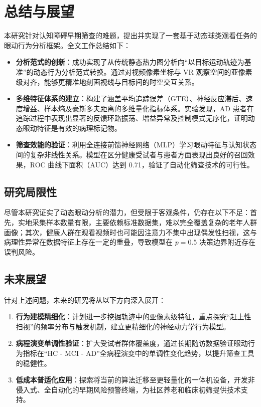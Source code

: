 \documentclass[12pt,hyperref,a4paper,UTF8]{ctexart}
\begin{document}
\section{总结与展望}
本研究针对认知障碍早期筛查的难题，提出并实现了一套基于动态球类观看任务的眼动行为分析框架。全文工作总结如下：

\begin{itemize}
    \item \textbf{分析范式的创新}：成功实现了从传统静态热力图分析向“以目标运动轨迹为基准”的动态行为分析范式转换。通过对视频像素坐标与 VR 观察空间的亚像素级对齐，能够更精准地刻画视线与目标间的时空交互关系。
    \item \textbf{多维特征体系的建立}：构建了涵盖平均追踪误差（GTE）、神经反应滞后、速度增益、样本熵及豪斯多夫距离的多维量化指标体系。实验发现，AD 患者在追踪过程中表现出显著的反馈环路振荡、增益异常及控制模式无序化，证明动态眼动特征是有效的病理标记物。
    \item \textbf{筛查效能的验证}：利用全连接前馈神经网络（MLP）学习眼动特征与认知状态间的复杂非线性关系。模型在区分健康受试者与患者方面表现出良好的召回效果，ROC 曲线下面积（AUC）达到 0.71，验证了自动化筛查技术的可行性。
\end{itemize}

\subsection{研究局限性}
尽管本研究证实了动态眼动分析的潜力，但受限于客观条件，仍存在以下不足：首先，实地采集样本数量有限，主要依赖标准数据集，难以完全覆盖复杂的老年人群画像；其次，健康人群在观看视频时也可能因注意力不集中出现偶发性扫视，这与病理性异常在数据特征上存在一定的重叠，导致模型在 $p=0.5$ 决策边界附近存在误判风险。

\subsection{未来展望}
针对上述问题，未来的研究将从以下方向深入展开：

\begin{enumerate}
    \item \textbf{行为建模精细化}：计划进一步挖掘轨迹中的亚像素级特征，重点探究“赶上性扫视”的频率分布与触发机制，建立更精细化的神经动力学行为模型。
    \item \textbf{病程演变单调性验证}：扩大受试者群体覆盖度，通过长期随访数据验证眼动行为指标在“HC - MCI - AD”全病程演变中的单调性变化趋势，以提升筛查工具的稳健性。
    \item \textbf{低成本普适化应用}：探索将当前的算法迁移至更轻量化的一体机设备，开发非侵入式、全自动化的早期风险预警终端，为社区养老和临床初筛提供技术支持。
\end{enumerate}






\end{document}
